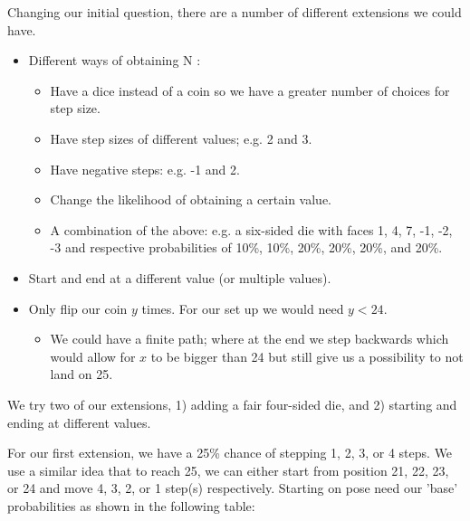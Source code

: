 \documentclass[11pt]{article}
\newcommand{\keywordfont}{\textsc}
\newcommand{\keyword}[1]{%
  \marginpar{\raggedright\small\keywordfont{#1}}}
\begin{document}
Changing our \keyword{Extend} initial question, there are a number of different extensions we could have.

\begin{itemize}
    \item Different ways of obtaining N :
    \begin{itemize}
        \item Have a dice instead of a coin so we have a greater number of choices for step size.
        \item Have step sizes of different values; e.g. 2 and 3.
        \item Have negative steps: e.g. -1 and 2.
        \item Change the likelihood of obtaining a certain value.
        \item         A combination of the above: e.g. a six-sided die with faces 1, 4, 7, -1, -2, -3 and respective probabilities of 10\%, 10\%, 20\%, 20\%, 20\%, and 20\%.
    \end{itemize}
    \item Start and end at a different value (or multiple values).
    \item Only flip our coin $y$ times. For our set up we would need $y < 24$.
    \begin{itemize}
        \item We could have a finite path; where at the end we step backwards which would allow for $x$ to be bigger than 24 but still give us a possibility to not land on 25.
    \end{itemize}
\end{itemize}

We try two of our \keyword{Extend} extensions, 1) adding a fair four-sided die, and 2) starting and ending at different values.

For our first extension, \keyword{Extend} we have a 25\% chance of stepping 1, 2, 3, or 4 steps. We use a similar idea that to reach 25, we can either start from position 21, 22, 23, or 24 and move 4, 3, 2, or 1 step(s) respectively. Starting on pose need our 'base' probabilities as shown in the following table:
\end{document}
